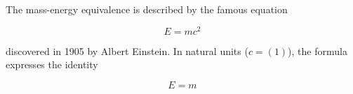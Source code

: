 The mass-energy equivalence is described by the famous equation

\[E=mc^2\]

discovered in 1905 by Albert Einstein.
In natural units ($c = (1)$), the formula expresses the identity

\begin{equation}
E=m
\end{equation}
